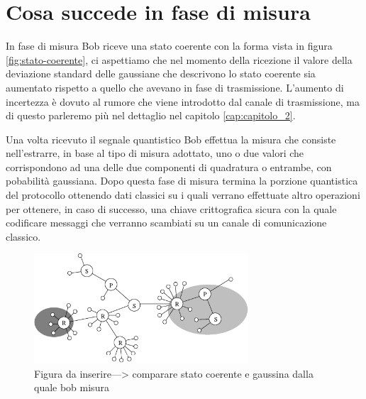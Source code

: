 \section{Cosa succede in fase di misura}
In fase di misura Bob riceve una stato coerente con la forma vista in figura \ref{fig:stato-coerente}, ci aspettiamo che nel momento della ricezione il valore della deviazione standard delle gaussiane che descrivono lo stato coerente sia aumentato rispetto a quello che avevano in fase di trasmissione. L'aumento di incertezza \`e dovuto al rumore che viene introdotto dal canale di trasmissione, ma di questo parleremo pi\`u nel dettaglio nel capitolo \ref{cap:capitolo_2}.

Una volta ricevuto il segnale quantistico Bob effettua la misura che consiste nell'estrarre, in base al tipo di misura adottato, uno o due valori che corrispondono ad una delle due componenti di quadratura o entrambe, con pobabilit\`a gaussiana. Dopo questa fase di misura termina la porzione quantistica del protocollo ottenendo dati classici su i quali verrano effettuate altro operazioni per ottenere, in caso di successo, una chiave crittografica sicura con la quale codificare messaggi che verranno scambiati su un canale di comunicazione classico.

\begin{figure}[ht] 
\begin{center}
\includegraphics[width=8cm]{figure/esempio-figura-1.eps}
\end{center}
\caption{Figura da inserire---> comparare stato coerente e gaussina dalla quale bob misura} \label{fig:bob-misura}
\end{figure}

